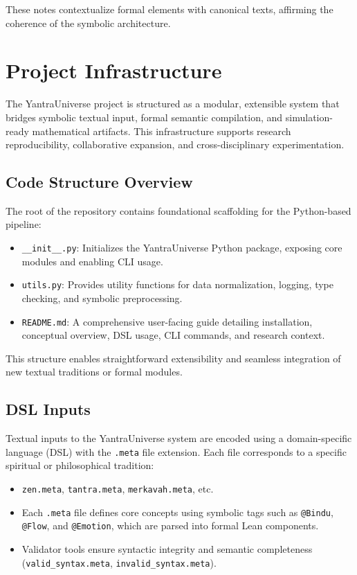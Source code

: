 \documentclass[12pt]{article}
\theoremstyle{plain}
\begin{document}
These notes contextualize formal elements with canonical texts, affirming the coherence of the symbolic architecture.

\section{Project Infrastructure}

The YantraUniverse project is structured as a modular, extensible system that bridges symbolic textual input, formal semantic compilation, and simulation-ready mathematical artifacts. This infrastructure supports research reproducibility, collaborative expansion, and cross-disciplinary experimentation.

\subsection{Code Structure Overview}

The root of the repository contains foundational scaffolding for the Python-based pipeline:

\begin{itemize}
  \item \texttt{\_\_init\_\_.py}: Initializes the YantraUniverse Python package, exposing core modules and enabling CLI usage.
  \item \texttt{utils.py}: Provides utility functions for data normalization, logging, type checking, and symbolic preprocessing.
  \item \texttt{README.md}: A comprehensive user-facing guide detailing installation, conceptual overview, DSL usage, CLI commands, and research context.
\end{itemize}

This structure enables straightforward extensibility and seamless integration of new textual traditions or formal modules.

\subsection{DSL Inputs}

Textual inputs to the YantraUniverse system are encoded using a domain-specific language (DSL) with the \texttt{.meta} file extension. Each file corresponds to a specific spiritual or philosophical tradition:

\begin{itemize}
  \item \texttt{zen.meta}, \texttt{tantra.meta}, \texttt{merkavah.meta}, etc.
  \item Each \texttt{.meta} file defines core concepts using symbolic tags such as \texttt{@Bindu}, \texttt{@Flow}, and \texttt{@Emotion}, which are parsed into formal Lean components.
  \item Validator tools ensure syntactic integrity and semantic completeness (\texttt{valid\_syntax.meta}, \texttt{invalid\_syntax.meta}).
\end{itemize}
\end{document}
